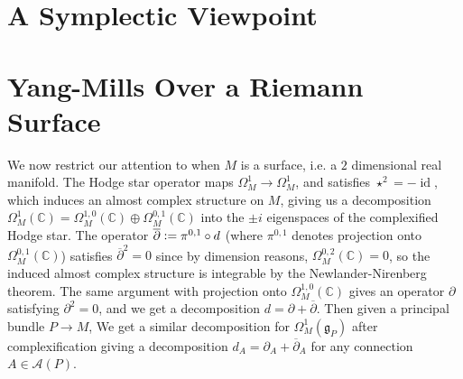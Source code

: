 \documentclass[psamsfonts, 12pt]{amsart}
\theoremstyle{definition}
\theoremstyle{remark}
\newcommand{\C}{\mathbb{C}}
\newcommand{\dbar}{\overline{\partial}}
\newcommand{\g}{\mathfrak{g}}
\newcommand{\defeq}{\vcentcolon=}
\DeclareMathOperator{\id}{id}
\begin{document}
\section{A Symplectic Viewpoint}
%

%
\section{Yang-Mills Over a Riemann Surface}
%
We now restrict our attention to when $M$ is a surface, i.e. a $2$ dimensional real
manifold. The Hodge star operator maps $\Omega^1_M \to \Omega^1_M$, and satisfies
$\star^2 = -\id$, which induces an almost complex structure on $M$, giving us a
decomposition $\Omega^1_M(\C) = \Omega^{1,0}_M(\C) \oplus \Omega^{0,1}_M(\C)$
into the $\pm i$ eigenspaces of the complexified Hodge star. The operator
$\dbar \defeq \pi^{0,1} \circ d$ (where $\pi^{0,1}$ denotes projection onto
$\Omega^{0,1}_M(\C)$) satisfies $\dbar^2 = 0$ since by dimension reasons,
$\Omega^{0,2}_M(\C) = 0$, so the induced almost complex structure is integrable by the
Newlander-Nirenberg theorem. The same argument with projection onto $\Omega^{1,0}_M(\C)$
gives an operator $\partial$ satisfying $\partial^2 = 0$, and we get a decomposition
$d = \partial + \dbar$. Then given a principal bundle $P \to M$, We get a similar
decomposition for $\Omega^1_M(\g_P)$ after complexification giving a decomposition
$d_A = \partial_A + \dbar_A$ for any connection $A \in \mathscr{A}(P)$.
%
\end{document}
